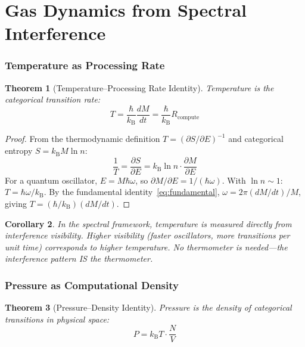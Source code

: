 \documentclass[twocolumn,10pt,a4paper]{article}
\theoremstyle{plain}
\newtheorem{theorem}{Theorem}[section]
\newtheorem{corollary}[theorem]{Corollary}
\theoremstyle{definition}
\theoremstyle{remark}
\newcommand{\kB}{k_{\mathrm{B}}}
\begin{document}
\part{Gas Dynamics from Spectral Interference}
\label{part:gas_dynamics}

\section{Temperature as Processing Rate}
\label{sec:temperature}

\begin{theorem}[Temperature--Processing Rate Identity]
\label{thm:temperature}
Temperature is the categorical transition rate:
\begin{equation}
\boxed{T = \frac{\hbar}{\kB}\frac{dM}{dt} = \frac{\hbar}{\kB}R_{\mathrm{compute}}}
\end{equation}
\end{theorem}

\begin{proof}
From the thermodynamic definition $T = (\partial S/\partial E)^{-1}$ and categorical entropy $S = \kB M \ln n$:
\begin{equation}
    \frac{1}{T} = \frac{\partial S}{\partial E} = \kB \ln n \cdot \frac{\partial M}{\partial E}
\end{equation}
For a quantum oscillator, $E = M\hbar\omega$, so $\partial M/\partial E = 1/(\hbar\omega)$. With $\ln n \sim 1$: $T = \hbar\omega/\kB$. By the fundamental identity~\eqref{eq:fundamental}, $\omega = 2\pi(dM/dt)/M$, giving $T = (\hbar/\kB)(dM/dt)$.
\end{proof}

\begin{corollary}
In the spectral framework, temperature is measured directly from interference visibility. Higher visibility (faster oscillators, more transitions per unit time) corresponds to higher temperature. No thermometer is needed---the interference pattern IS the thermometer.
\end{corollary}

\section{Pressure as Computational Density}
\label{sec:pressure}

\begin{theorem}[Pressure--Density Identity]
\label{thm:pressure}
Pressure is the density of categorical transitions in physical space:
\begin{equation}
\boxed{P = \kB T \cdot \frac{N}{V}}
\end{equation}
\end{theorem}
\end{document}

